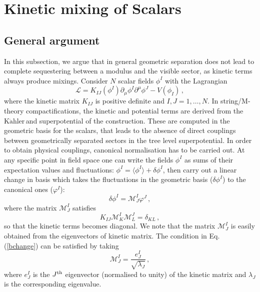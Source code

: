 \documentclass[11pt,a4paper]{article}
\newcommand{\Kahler}{\ensuremath{\text{K}\ddot{\text{a}}\text{hler}\,}}
\def\pref#1{(\ref{#1})}
\begin{document}
\section{Kinetic mixing of Scalars}

\label{sec:kin}

\subsection{General argument}

In this subsection, we  argue that in general geometric separation does not lead to complete sequestering between a modulus and the visible sector, as kinetic terms always produce mixings. Consider $N$ scalar fields $\phi^I$ with the Lagrangian
\begin{equation}
\mathcal{L} = K_{IJ} (\phi^{I}) \partial_\mu \phi^I \partial^\mu \phi^J - V(\phi_I) \,,
\end{equation}
where the kinetic matrix $K_{IJ}$ is positive definite and $I, J = 1, \dots, N$. In string/M-theory compactifications, the kinetic and  potential terms are derived from the \Kahler and superpotential of the construction. These are computed in the geometric basis for the scalars, that leads to the absence of direct couplings between geometrically separated sectors in the tree level superpotential. In order to obtain physical couplings, canonical normalisation has to be carried out. At any specific point in field space one can write the fields
 $\phi^{I}$ as sums of their expectation values and fluctuations: $\phi^{I} = \langle \phi^I \rangle + \delta \phi^{I}$, then carry out a linear change in basis which takes the fluctuations in the geometric basis ($\delta \phi^{I}$) to the canonical ones ($\varphi^{I}$):
%
\begin{equation}
\delta \phi^I = \mathcal{M}^I_J \varphi^J \,,
\end{equation}
%
where the matrix $\mathcal{M}^{I}_{J}$ satisfies
\begin{equation}
\label{bchange}
K_{IJ} \mathcal{M}^I_K \mathcal{M}^J_L = \delta_{KL} \,,
\end{equation}
%
so that the kinetic terms becomes diagonal. We note that the matrix $\mathcal{M}^{I}_{J}$ is easily obtained from the eigenvectors of kinetic matrix. The condition in Eq. \pref{bchange} can be satisfied by taking
%
\begin{equation}
\label{eq:RotationGeneral}
\mathcal{M}^I_J = \frac{e^I_J}{\sqrt{\lambda_J}} \,,
\end{equation}
%
where $e^{I}_{J}$ is the $J^{\rm th}$ eigenvector (normalised to unity) of the kinetic matrix and $\lambda_J$ is the corresponding eigenvalue.
\end{document}
